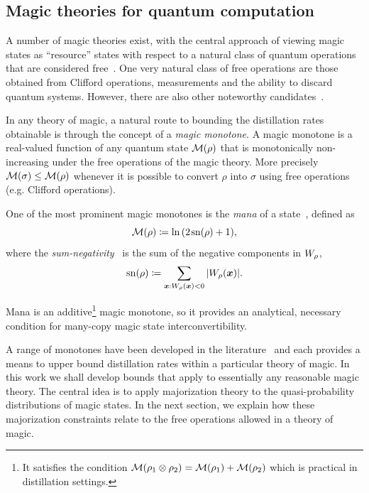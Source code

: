 \documentclass[pra,
aps,
twocolumn,
superscriptaddress,
groupedaddress,
nofootinbib,
reprint
]{revtex4-1}
\begin{document}
\subsection{Magic theories for quantum computation}
\label{sec:mono}

A number of magic theories exist, with the central approach of viewing magic states as ``resource'' states with respect to a natural class of quantum operations that are considered free~\cite{Gour_2019}. One very natural class of free operations are those obtained from Clifford operations, measurements and the ability to discard quantum systems. However, there are also other noteworthy candidates~\cite{cit:ahmadi, cit:seddon, Wang_2019}.

In any theory of magic, a natural route to bounding the distillation rates obtainable is through the concept of a \emph{magic monotone}. A magic monotone is a real-valued function of any quantum state ${\mathcal M}(\rho)$ that is monotonically non-increasing under the free operations of the magic theory. More precisely ${\mathcal M}(\sigma) \le {\mathcal M}(\rho)$ whenever it is possible to convert $\rho$ into $\sigma$ using free operations (e.g. Clifford operations).

One of the most prominent magic monotones is the \emph{mana} of a state~\cite{cit:veitch2}, defined as
\begin{equation}
    { {\mathcal M} (\rho)} \coloneqq \ln{(2\hspace{1pt} {{\rm{sn}}(\rho)} +1)},
\end{equation}
where the \emph{sum-negativity}~\cite{cit:veitch2} is the sum of the negative components in $\W{\rho}$,
\begin{equation}
    \sn{\rho} \coloneqq \sum\limits_{\bmx: \W[\bmx]{\rho} < 0} \abs{\W[\bmx]{\rho}}.
\end{equation}

Mana is an additive\footnote{It satisfies the condition ${{\mathcal M}(\rho_1 \otimes \rho_2)} = {{\mathcal M}(\rho_1)} + {{\mathcal M}(\rho_2)}$ which is practical in distillation settings.} magic monotone, so it provides an analytical, necessary condition for many-copy magic state interconvertibility.

A range of monotones have been developed in the literature~\cite{cit:howard, Wang_2020, Seddon_2021} and each provides a means to upper bound distillation rates within a particular theory of magic. In this work we shall develop bounds that apply to essentially any reasonable magic theory. The central idea is to apply majorization theory to the quasi-probability distributions of magic states. In the next section, we explain how these majorization constraints relate to the free operations allowed in a theory of magic.
\end{document}
